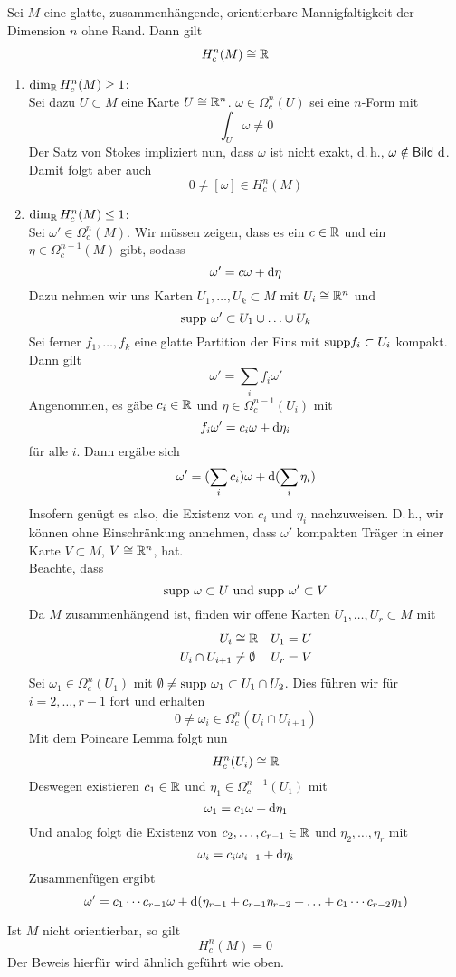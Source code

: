 \Satz{}
Sei $M$ eine glatte, zusammenhängende, orientierbare Mannigfaltigkeit der Dimension $n$ ohne Rand. Dann gilt
\[ H^n_c(M) \overset{}{\cong} \mathbb{R} \]
\begin{Beweis}{}
\begin{enumerate}
	\item $\dim_{\mathbb{R}} H^n_c(M)\geq 1$:\\
	Sei dazu $U\subset M$ eine Karte $U \overset{}{\cong} \mathbb{R}^n$. $\omega \in \Omega_c^n(U)$ sei eine $n$-Form mit
	\[ \int_{U}\omega \neq 0 \]
	Der Satz von Stokes impliziert nun, dass $\omega$ ist nicht exakt, d.\,h., $\omega \notin \Img\ \d$. Damit folgt aber auch
	\[ 0\neq [\omega] \in H^n_c(M) \]
	\item $\dim_{\mathbb{R}} H^n_c(M) \leq 1$:\\
	Sei $\omega' \in \Omega_c^n(M)$. Wir müssen zeigen, dass es ein $c\in \mathbb{R}$ und ein $\eta \in \Omega_c^{n-1}(M)$ gibt, sodass
	\[ \omega' = c\omega + \text{d} \eta \]
	Dazu nehmen wir uns Karten $U_1, \ldots, U_k \subset M$ mit $U_i \overset{}{\cong}\mathbb{R}^n$ und
	\[\text{supp}\ \omega' \subset U_1\cup \ldots \cup U_k\]
	Sei ferner $f_1,\ldots, f_k$ eine glatte Partition der Eins mit $\text{supp} f_i \subset U_i$ kompakt. Dann gilt
	\[ \omega' = \sum_{i} f_i \omega' \]
	Angenommen, es gäbe $c_i \in \mathbb{R}$ und $\eta\in \Omega_c^{n-1}(U_i)$ mit
	\[ f_i \omega' = c_i\omega + \text{d} \eta_i \]
	für alle $i$. Dann ergäbe sich
	\[ \omega' = (\sum_{i}c_i) \omega + \text{d} (\sum_{i} \eta_i) \]
	Insofern genügt es also, die Existenz von $c_i$ und $\eta_i$ nachzuweisen. D.\,h., wir können ohne Einschränkung annehmen, dass $\omega'$ kompakten Träger in einer Karte $V \subset M$, $V \overset{}{\cong} \mathbb{R}^n$, hat.\\
	Beachte, dass
	\[ \text{supp}\ \omega \subset U \text{  und  } \text{supp}\ \omega' \subset V \]
	Da $M$ zusammenhängend ist, finden wir offene Karten $U_1, \ldots, U_r \subset M$ mit
	\begin{align*}
		U_i             & \overset{}{\cong} \mathbb{R}     & U_1 & = U \\
		U_i\cap U_{i+1} & \neq \emptyset & U_r & = V
	\end{align*}
	Sei $\omega_1 \in \Omega_c^n(U_1)$ mit $\emptyset \neq \text{supp}\ \omega_1 \subset U_1 \cap U_2$. Dies führen wir für $i = 2, \ldots, r-1$ fort und erhalten
	\[ 0\neq \omega_i \in \Omega^n_c(U_i\cap U_{i+1})  \]
	Mit dem Poincare Lemma folgt nun
	\[ H^n_c(U_i) \overset{}{\cong} \mathbb{R} \]
	Deswegen existieren $c_1 \in \mathbb{R}$ und $\eta_1 \in \Omega^{n-1}_c(U_1)$ mit
	\[ \omega_1 = c_1 \omega + \text{d} \eta_1 \]
	Und analog folgt die Existenz von $c_2, \ldots, c_{r-1} \in \mathbb{R}$ und $\eta_2, \ldots, \eta_r$ mit
	\[ \omega_i = c_i \omega_{i-1} + \text{d} \eta_i \]
	Zusammenfügen ergibt
	\[ \omega' = c_1 \cdots c_{r-1} \omega + \text{d} (\eta_{r-1} +c_{r-1}\eta_{r-2} + \ldots + c_{1}\cdots c_{r-2}\eta_1) \]
\end{enumerate}
\end{Beweis}
\Bem{}
Ist $M$ nicht orientierbar, so gilt
\[ H^n_c(M) = 0 \]
Der Beweis hierfür wird ähnlich geführt wie oben.

